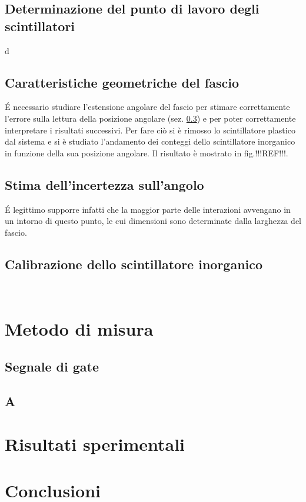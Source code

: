 \documentclass[11pt]{article}
\begin{document}
\subsection{Determinazione del punto di lavoro degli scintillatori}
d
\subsection{Caratteristiche geometriche del fascio}
\'E necessario studiare l'estensione angolare del fascio per stimare correttamente l'errore sulla lettura della posizione angolare (sez. \ref{subsec:err_angolo}) e per poter correttamente interpretare i risultati successivi. Per fare ciò si è rimosso lo scintillatore plastico dal sistema e si è studiato l'andamento dei conteggi dello scintillatore inorganico in funzione della sua posizione angolare. Il risultato è mostrato in fig.!!!REF!!!.




\subsection{Stima dell'incertezza sull'angolo} \label{subsec:err_angolo}
 \'E legittimo supporre infatti che la maggior parte delle interazioni avvengano in un intorno di questo punto, le cui dimensioni sono determinate dalla larghezza del fascio. \\



\subsection{Calibrazione dello scintillatore inorganico}
\

\section{Metodo di misura}
\justify
\subsection{Segnale di gate}

\subsection{A}

\section{Risultati sperimentali}
\justify

\section{Conclusioni}
\justify



\end{document}
